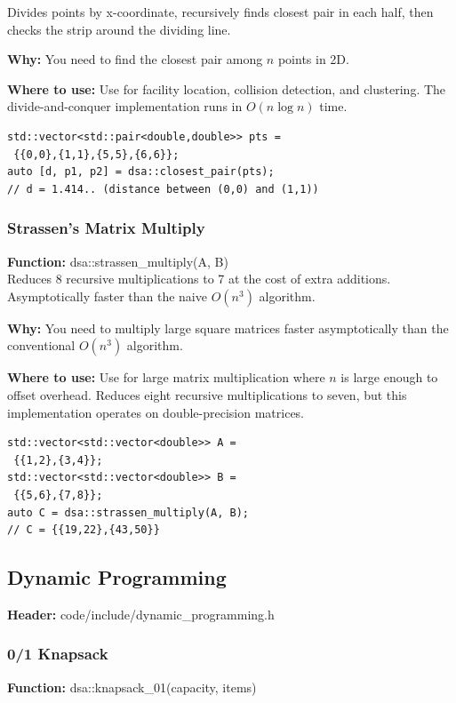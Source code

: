 \documentclass[11pt]{article}
\begin{document}
Divides points by x-coordinate, recursively finds closest pair in each half, then checks the strip around the dividing line.

\textbf{Why:} You need to find the closest pair among \(n\) points in 2D. \par \textbf{Where to use:} Use for facility location, collision detection, and clustering. The divide-and-conquer implementation runs in \(O(n\log n)\) time.

\begin{lstlisting}
std::vector<std::pair<double,double>> pts =
 {{0,0},{1,1},{5,5},{6,6}};
auto [d, p1, p2] = dsa::closest_pair(pts);
// d = 1.414.. (distance between (0,0) and (1,1))
\end{lstlisting}

\subsubsection{Strassen's Matrix Multiply}
\textbf{Function:} dsa::strassen\_multiply(A, B)\\

Reduces 8 recursive multiplications to 7 at the cost of extra additions. Asymptotically faster than the naive \(O(n^3)\) algorithm.

\textbf{Why:} You need to multiply large square matrices faster asymptotically than the conventional \(O(n^3)\) algorithm. \par \textbf{Where to use:} Use for large matrix multiplication where \(n\) is large enough to offset overhead. Reduces eight recursive multiplications to seven, but this implementation operates on double-precision matrices.

\begin{lstlisting}
std::vector<std::vector<double>> A =
 {{1,2},{3,4}};
std::vector<std::vector<double>> B =
 {{5,6},{7,8}};
auto C = dsa::strassen_multiply(A, B);
// C = {{19,22},{43,50}}
\end{lstlisting}

\subsection{Dynamic Programming}
\textbf{Header:} code/include/dynamic\_programming.h

\subsubsection{0/1 Knapsack}
\textbf{Function:} dsa::knapsack\_01(capacity, items)\\
\end{document}
